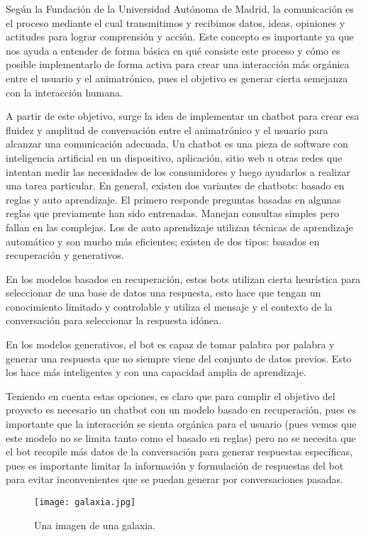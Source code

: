 Según la Fundación de la Universidad Autónoma de Madrid, la comunicación es el proceso mediante el cual transmitimos y recibimos datos, ideas, opiniones y actitudes para lograr comprensión y acción. Este concepto es importante ya que nos ayuda a entender de forma básica en qué consiste este proceso y cómo es posible implementarlo de forma activa para crear una interacción más orgánica entre el usuario y el animatrónico, pues el objetivo es generar cierta semejanza con la interacción humana.

A partir de este objetivo, surge la idea de implementar un chatbot para crear esa fluidez y amplitud de conversación entre el animatrónico y el usuario para alcanzar una comunicación adecuada. Un chatbot es una pieza de software con inteligencia artificial en un dispositivo, aplicación, sitio web u otras redes que intentan medir las necesidades de los consumidores y luego ayudarlos a realizar una tarea particular. En general, existen dos variantes de chatbots: basado en reglas y auto aprendizaje. El primero responde preguntas basadas en algunas reglas que previamente han sido entrenadas. Manejan consultas simples pero fallan en las complejas. Los de auto aprendizaje utilizan técnicas de aprendizaje automático y son mucho más eficientes; existen de dos tipos: basados en recuperación y generativos.

En los modelos basados en recuperación, estos bots utilizan cierta heurística para seleccionar de una base de datos una respuesta, esto hace que tengan un conocimiento limitado y controlable y utiliza el mensaje y el contexto de la conversación para seleccionar la respuesta idónea.

En los modelos generativos, el bot es capaz de tomar palabra por palabra y generar una respuesta que no siempre viene del conjunto de datos previos. Esto los hace más inteligentes y con una capacidad amplia de aprendizaje.

Teniendo en cuenta estas opciones, es claro que para cumplir el objetivo del proyecto es necesario un chatbot con un modelo basado en recuperación, pues es importante que la interacción se sienta orgánica para el usuario (pues vemos que este modelo no se limita tanto como el basado en reglas) pero no se necesita que el bot recopile más datos de la conversación para generar respuestas específicas, pues es importante limitar la información y formulación de respuestas del bot para evitar inconvenientes que se puedan generar por conversaciones pasadas.


\begin{figure}[t]
    \centering
    \texttt{[image: galaxia.jpg]}
    \caption{Una imagen de una galaxia.}
    \label{fig:mesh1}
\end{figure}

